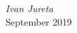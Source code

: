 \documentclass[graybox,envcountchap,sectrefs]{svmono}
\newcommand{\ncnf}{New Concept Network}
\begin{document}


%
%
%
 

\vspace{\baselineskip}
\begin{flushright}\noindent
\hfill {\it Ivan  Jureta}\\
September 2019\hfill {\it }\\
\end{flushright}





%

\tableofcontents

%

\mainmatter
\end{document}
